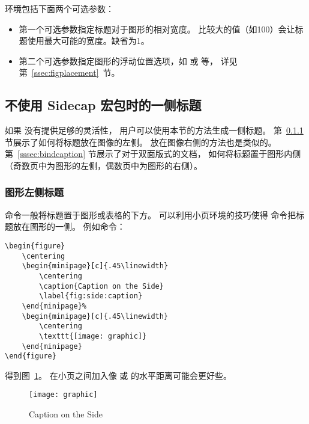  环境包括下面两个可选参数：
\begin{itemize}
	\item 第一个可选参数指定标题对于图形的相对宽度。
	比较大的值（如100）会让标题使用最大可能的宽度。缺省为1。
	\item 第二个可选参数指定图形的浮动位置选项，如 \opt{[htp]}或 \opt{[!ht]} 等，
	详见第~\ref{ssec:figplacement}~节。
\end{itemize}

\subsection{不使用 Sidecap 宏包时的一侧标题}

如果  没有提供足够的灵活性，
用户可以使用本节的方法生成一侧标题。
第~\ref{sssec:leftcaption} 节展示了如何将标题放在图像的左侧。
放在图像右侧的方法也是类似的。
第~\ref{sssec:bindcaption} 节展示了对于双面版式的文档，
如何将标题置于图形内侧（奇数页中为图形的左侧，偶数页中为图形的右侧）。

\subsubsection{图形左侧标题}\label{sssec:leftcaption}

  命令一般将标题置于图形或表格的下方。
可以利用小页环境的技巧使得  命令把标题放在图形的一侧。
例如命令：
\begin{lstlisting}
\begin{figure}
	\centering
	\begin{minipage}[c]{.45\linewidth}
		\centering
		\caption{Caption on the Side}
		\label{fig:side:caption}
	\end{minipage}%
	\begin{minipage}[c]{.45\linewidth}
		\centering
		\texttt{[image: graphic]}
	\end{minipage}
\end{figure}
\end{lstlisting}
得到图~\ref{fig:side:caption}。
在小页之间加入像  或  的水平距离可能会更好些。

\begin{figure}
	\centering
	\begin{minipage}[c]{.45\linewidth}
		\centering
		\caption{Caption on the Side}
		\label{fig:side:caption}
	\end{minipage}%
	\begin{minipage}[c]{.45\linewidth}
		\centering
		\texttt{[image: graphic]}
	\end{minipage}
\end{figure}

